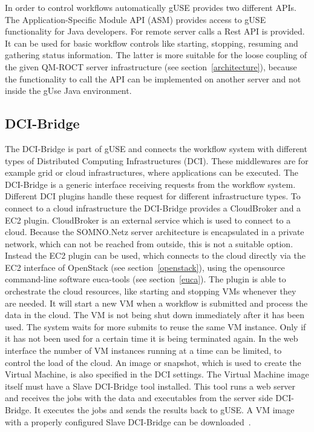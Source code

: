 In order to control workflows automatically gUSE provides two different APIs.
The Application-Specific Module API (ASM) provides access to gUSE functionality for Java developers.
For remote server calls a Rest API is provided. It can be used for basic workflow controls like starting, stopping, resuming and gathering status information.
The latter is more suitable for the loose coupling of the given QM-ROCT server infrastructure (see section~\ref{architecture}), because the functionality to call the API can be implemented on another server and not inside the gUse Java environment.

\subsection{DCI-Bridge}\label{dci}

The DCI-Bridge is part of gUSE and connects the workflow system with different types of Distributed Computing Infrastructures (DCI).
These middlewares are for example grid or cloud infrastructures, where applications can be executed.
The DCI-Bridge is a generic interface receiving requests from the workflow system.
Different DCI plugins handle these request for different infrastructure types.
To connect to a cloud infrastructure the DCI-Bridge provides a CloudBroker and a EC2 plugin.
CloudBroker is an external service which is used to connect to a cloud.
Because the SOMNO.Netz server architecture is encapsulated in a private network, which can not be reached from outside, this is not a suitable option.
Instead the EC2 plugin can be used, which connects to the cloud directly via the EC2 interface of OpenStack (see section~\ref{openstack}), using the opensource command-line software euca-tools (see section~\ref{euca}).
The plugin is able to orchestrate the cloud resources, like starting and stopping VMs whenever they are needed.
It will start a new VM when a workflow is submitted and process the data in the cloud.
The VM is not being shut down immediately after it has been used.
The system waits for more submits to reuse the same VM instance.
Only if it has not been used for a certain time it is being terminated again.
In the web interface the number of VM instances running at a time can be limited, to control the load of the cloud. 
An image or snapshot, which is used to create the Virtual Machine, is also specified in the DCI settings.
The Virtual Machine image itself must have a Slave DCI-Bridge tool installed.
This tool runs a web server and receives the jobs with the data and executables from the server side DCI-Bridge.
It executes the jobs and sends the results back to gUSE.
A VM image with a properly configured Slave DCI-Bridge can be downloaded~\cite{slavedci}.

